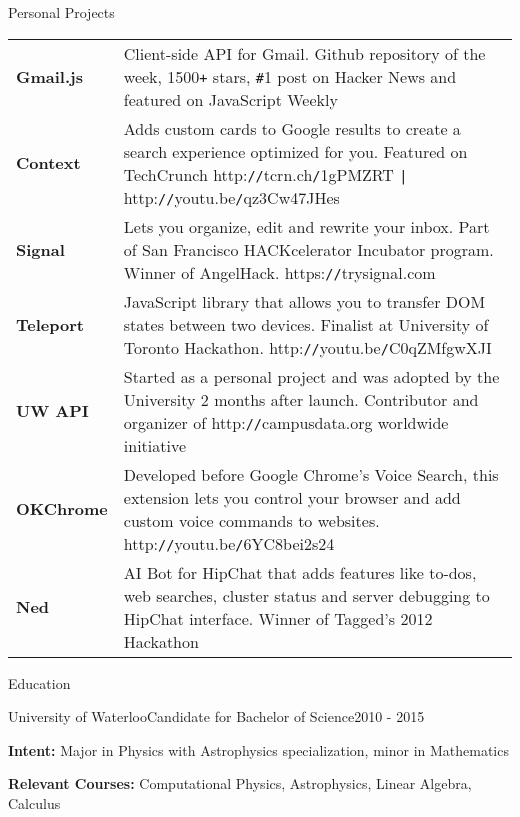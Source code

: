\documentclass[oneside]{resume}
\begin{document}
  \begin{rSection}{Personal Projects}

    \begin{tabular}{@{} >{\bfseries}l @{\hspace{1ex}:\hspace{1ex}} p{14.5cm}}
      Gmail.js & Client-side API for Gmail. Github repository of the week, 1500\texttt{+} stars,
                 \texttt{\#}1 post on Hacker News and featured on JavaScript Weekly \\[0.5ex]

      Context  & Adds custom cards to Google results to create a search experience optimized for you. 
                 Featured on TechCrunch http:\texttt{//}tcrn.ch\texttt{/}1gPMZRT \texttt{|} http:\texttt{//}youtu.be\texttt{/}qz3Cw47JHes \\[0.5ex]

      Signal   & Lets you organize, edit and rewrite your inbox. Part of San Francisco HACKcelerator
                 Incubator program. Winner of AngelHack. https:\texttt{//}trysignal.com \\[0.5ex]

      Teleport & JavaScript library that allows you to transfer DOM states between two devices.
                 Finalist at University of Toronto Hackathon. http:\texttt{//}youtu.be\texttt{/}C0qZMfgwXJI \\[0.5ex]

      UW API   & Started as a personal project and was adopted by the University 2 months after launch.
                 Contributor and organizer of http:\texttt{//}campusdata.org worldwide initiative  \\[0.5ex]

      OKChrome & Developed before Google Chrome's Voice Search, this extension lets you control your browser
                 and add custom voice commands to websites. http:\texttt{//}youtu.be\texttt{/}6YC8bei2s24 \\[0.5ex]

      Ned      & AI Bot for HipChat that adds features like to-dos, web searches, cluster status and server
                 debugging to HipChat interface. Winner of Tagged's 2012 Hackathon \\
    \end{tabular}

  \end{rSection}


  \begin{rSection}{Education}

    \begin{rEducation}{University of Waterloo}{Candidate for Bachelor of Science}{}{2010 - 2015}
      \item {\bfseries{Intent:}} Major in Physics with Astrophysics specialization, minor in Mathematics
      \item {\bfseries{Relevant Courses:}} Computational Physics, Astrophysics, Linear Algebra, Calculus
    \end{rEducation}

  \end{rSection}
\end{document}
